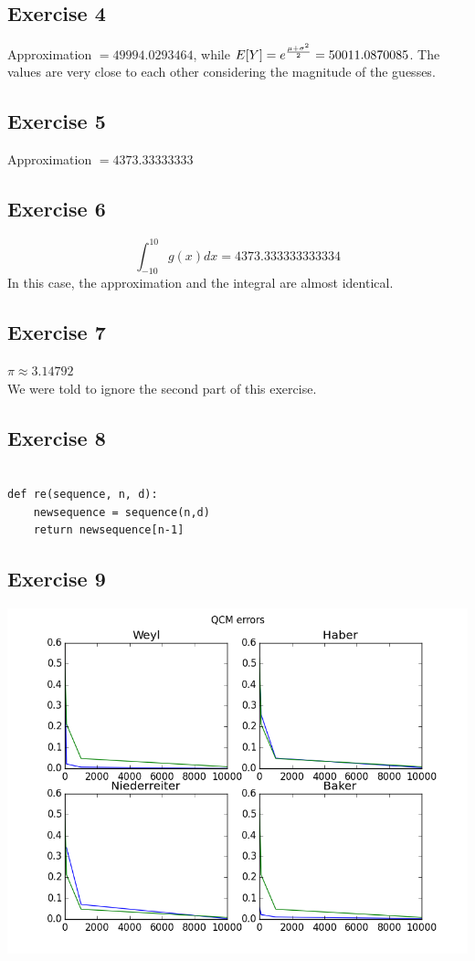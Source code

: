 \documentclass[letterpaper,12pt]{article}
\theoremstyle{definition}
\begin{document}
\subsection*{Exercise 4}

Approximation $= 49994.0293464$, while 
$E[Y] = e^{\mu+ {\sigma^2} \over 2} = 50011.0870085$.
The values are very close to each other considering the magnitude of the guesses.

\subsection*{Exercise 5}
Approximation $= 
4373.33333333$

\subsection*{Exercise 6}
\[ \int_{-10}^{10} g(x) dx = 4373.333333333334\]
In this case, the approximation and the integral are almost identical.

\subsection*{Exercise 7}

$\pi \approx 3.14792$\\
We were told to ignore the second part of this exercise.

\subsection*{Exercise 8}
\begin{lstlisting}

def re(sequence, n, d):
    newsequence = sequence(n,d)
    return newsequence[n-1]
\end{lstlisting}
\bigskip
\subsection*{Exercise 9}

\includegraphics[scale = .75]{QMCerrors}
\end{document}
